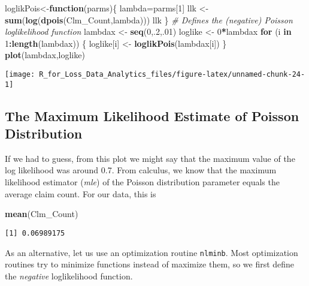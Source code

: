 \documentclass[]{book}
\newenvironment{Shaded}{\begin{snugshade}}{\end{snugshade}}
\newcommand{\KeywordTok}[1]{\textcolor[rgb]{0.13,0.29,0.53}{\textbf{#1}}}
\newcommand{\DecValTok}[1]{\textcolor[rgb]{0.00,0.00,0.81}{#1}}
\newcommand{\StringTok}[1]{\textcolor[rgb]{0.31,0.60,0.02}{#1}}
\newcommand{\CommentTok}[1]{\textcolor[rgb]{0.56,0.35,0.01}{\textit{#1}}}
\newcommand{\ControlFlowTok}[1]{\textcolor[rgb]{0.13,0.29,0.53}{\textbf{#1}}}
\newcommand{\OperatorTok}[1]{\textcolor[rgb]{0.81,0.36,0.00}{\textbf{#1}}}
\newcommand{\NormalTok}[1]{#1}
\theoremstyle{definition}
\theoremstyle{definition}
\theoremstyle{definition}
\theoremstyle{remark}
\begin{document}
\begin{Shaded}
\begin{Highlighting}[]
\NormalTok{loglikPois<-}\ControlFlowTok{function}\NormalTok{(parms)\{ }
\NormalTok{  lambda=parms[}\DecValTok{1}\NormalTok{]}
\NormalTok{  llk <-}\StringTok{ }\KeywordTok{sum}\NormalTok{(}\KeywordTok{log}\NormalTok{(}\KeywordTok{dpois}\NormalTok{(Clm_Count,lambda)))}
\NormalTok{  llk}
\NormalTok{\} }\CommentTok{# Defines the (negative) Poisson loglikelihood function}
\NormalTok{lambdax <-}\StringTok{ }\KeywordTok{seq}\NormalTok{(}\DecValTok{0}\NormalTok{,.}\DecValTok{2}\NormalTok{,.}\DecValTok{01}\NormalTok{)}
\NormalTok{loglike <-}\StringTok{ }\DecValTok{0}\OperatorTok{*}\NormalTok{lambdax}
\ControlFlowTok{for}\NormalTok{ (i }\ControlFlowTok{in} \DecValTok{1}\OperatorTok{:}\KeywordTok{length}\NormalTok{(lambdax)) }
\NormalTok{  \{}
\NormalTok{  loglike[i] <-}\StringTok{ }\KeywordTok{loglikPois}\NormalTok{(lambdax[i])}
\NormalTok{\}}
\KeywordTok{plot}\NormalTok{(lambdax,loglike)}
\end{Highlighting}
\end{Shaded}

\begin{center}\texttt{[image: R\_for\_Loss\_Data\_Analytics\_files/figure-latex/unnamed-chunk-24-1]} \end{center}

\subsection{The Maximum Likelihood Estimate of Poisson
Distribution}\label{the-maximum-likelihood-estimate-of-poisson-distribution}

If we had to guess, from this plot we might say that the maximum value
of the log likelihood was around 0.7. From calculus, we know that the
maximum likelihood estimator (\emph{mle}) of the Poisson distribution
parameter equals the average claim count. For our data, this is

\begin{Shaded}
\begin{Highlighting}[]
\KeywordTok{mean}\NormalTok{(Clm_Count)}
\end{Highlighting}
\end{Shaded}

\begin{verbatim}
[1] 0.06989175
\end{verbatim}

As an alternative, let us use an optimization routine \texttt{nlminb}.
Most optimization routines try to minimize functions instead of maximize
them, so we first define the \emph{negative} loglikelihood function.
\end{document}
